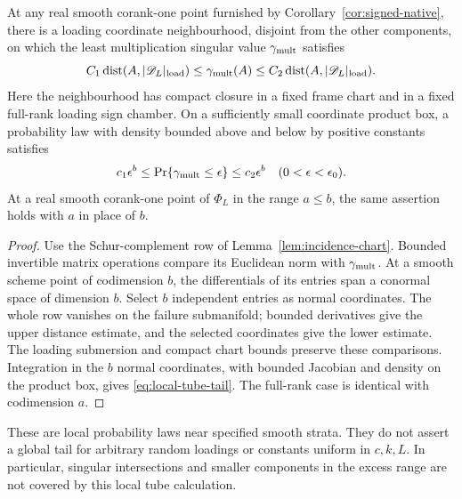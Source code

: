 \begin{corollary}\label{cor:local-tail}
At any real smooth corank-one point furnished by Corollary~\ref{cor:signed-native}, there is a loading coordinate neighbourhood, disjoint from the other components, on which the least multiplication singular value $\gamma_{\rm mult}$ satisfies
\begin{equation}\label{eq:local-distance-law}
 C_1\operatorname{dist}(A,|\mathscr D_L|_{\rm load})
 \le\gamma_{\rm mult}(A)\le
 C_2\operatorname{dist}(A,|\mathscr D_L|_{\rm load}).
\end{equation}
Here the neighbourhood has compact closure in a fixed frame chart and in a fixed full-rank loading sign chamber. On a sufficiently small coordinate product box, a probability law with density bounded above and below by positive constants satisfies
\begin{equation}\label{eq:local-tube-tail}
 c_1\epsilon^b\le\Pr\{\gamma_{\rm mult}\le\epsilon\}\le c_2\epsilon^b
       \quad(0<\epsilon<\epsilon_0).
\end{equation}
At a real smooth corank-one point of $\Phi_L$ in the range $a\le b$, the same assertion holds with $a$ in place of $b$.
\end{corollary}
\begin{proof}
Use the Schur-complement row of Lemma~\ref{lem:incidence-chart}. Bounded invertible matrix operations compare its Euclidean norm with $\gamma_{\rm mult}$. At a smooth scheme point of codimension $b$, the differentials of its entries span a conormal space of dimension $b$. Select $b$ independent entries as normal coordinates. The whole row vanishes on the failure submanifold; bounded derivatives give the upper distance estimate, and the selected coordinates give the lower estimate. The loading submersion and compact chart bounds preserve these comparisons. Integration in the $b$ normal coordinates, with bounded Jacobian and density on the product box, gives \eqref{eq:local-tube-tail}. The full-rank case is identical with codimension $a$.
\end{proof}
These are local probability laws near specified smooth strata. They do not assert a global tail for arbitrary random loadings or constants uniform in $c,k,L$. In particular, singular intersections and smaller components in the excess range are not covered by this local tube calculation.
